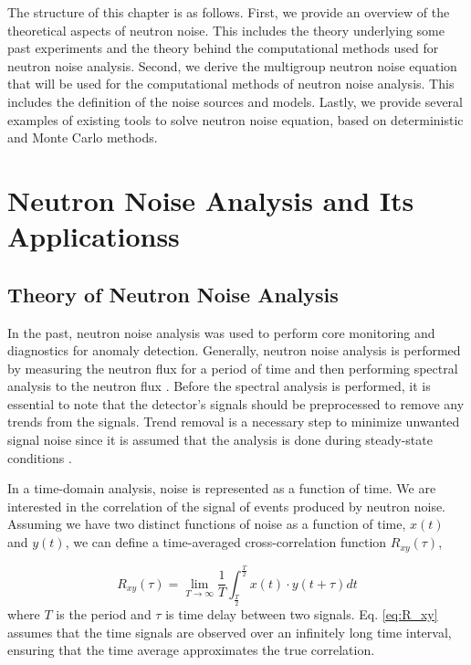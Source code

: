 The structure of this chapter is as follows. First, we provide an overview of the theoretical aspects of neutron noise. This includes the theory underlying some past experiments and the theory behind the computational methods used for neutron noise analysis. Second, we derive the multigroup neutron noise equation that will be used for the computational methods of neutron noise analysis. This includes the definition of the noise sources and models. Lastly, we provide several examples of existing tools to solve neutron noise equation, based on deterministic and Monte Carlo methods.

\section{Neutron Noise Analysis and Its Applicationss}

\subsection{Theory of Neutron Noise Analysis}

In the past, neutron noise analysis was used to perform core monitoring and diagnostics for anomaly detection. Generally, neutron noise analysis is performed by measuring the neutron flux for a period of time and then performing spectral analysis to the neutron flux \cite{fryExperienceReactorMalfunction1971}. Before the spectral analysis is performed, it is essential to note that the detector’s signals should be preprocessed to remove any trends from the signals. Trend removal is a necessary step to minimize unwanted signal noise since it is assumed that the analysis is done during steady-state conditions  \cite{mylonakisCORESIMSimulations2021}.

In a time-domain analysis, noise is represented as a function of time. We are interested in the correlation of the signal of events produced by neutron noise. Assuming we have two distinct functions of noise as a function of time, $x(t)$ and $y(t)$, we can define a time-averaged cross-correlation function $R_{xy} (\tau)$,

\begin{equation}
    R_{xy}(\tau) = \lim_{T \rightarrow \infty} \frac{1}{T} \int_{\frac{T}{2}}^{\frac{T}{2}} x(t) \cdot y(t+\tau) dt
    \label{eq:R_xy}
\end{equation}
where $T$ is the period and $\tau$ is time delay between two signals. Eq. \ref{eq:R_xy} assumes that the time signals are observed over an infinitely long time interval, ensuring that the time average approximates the true correlation.

